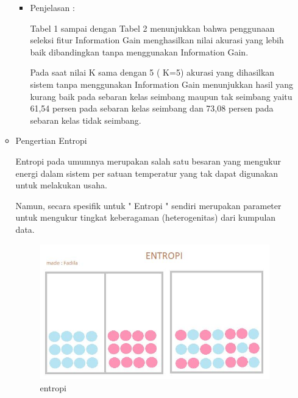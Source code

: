 \begin{enumerate}
\begin{itemize}
\begin{itemize}
\item Penjelasan :
\par Tabel  1  sampai  dengan  Tabel  2 menunjukkan  bahwa  penggunaan  seleksi fitur Information  Gain  menghasilkan  nilai  akurasi yang  lebih  baik  dibandingkan  tanpa menggunakan Information Gain. 
\par Pada saat nilai K sama dengan 5 ( K=5) akurasi  yang  dihasilkan  sistem  tanpa menggunakan  Information  Gain  menunjukkan hasil  yang  kurang  baik  pada  sebaran  kelas seimbang maupun tak seimbang yaitu  61,54 persen pada sebaran kelas seimbang dan 73,08 persen pada sebaran  kelas tidak  seimbang. 
\end{itemize}


\par
\item Pengertian Entropi
\par Entropi pada umumnya merupakan salah satu besaran yang mengukur energi dalam sistem per satuan temperatur yang tak dapat digunakan untuk melakukan usaha.
\par Namun, secara spesifik untuk " Entropi " sendiri merupakan parameter untuk mengukur tingkat keberagaman (heterogenitas) dari kumpulan data. 

\par

\begin{figure}[ht]
\centering
\includegraphics[scale=0.5]{figures/entropi.jpg}
\caption{entropi}
\label{contoh}
\end{figure}

\par
\end{itemize}

\end{enumerate}

